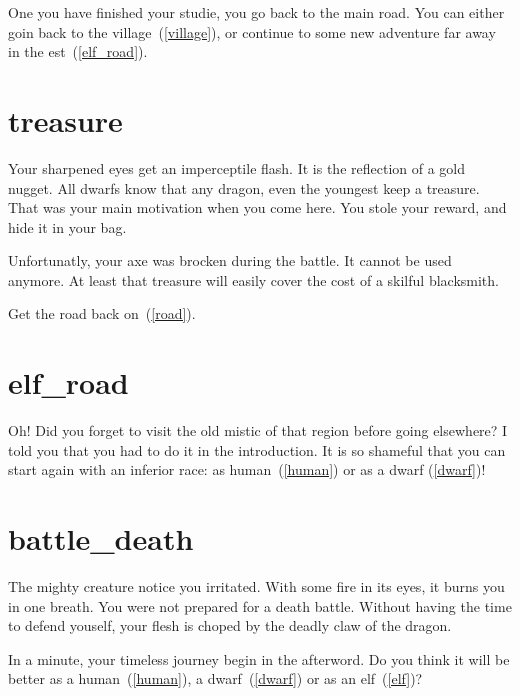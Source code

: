 One you have finished your studie, you go back to the main road. You can either
goin back to the village~(\ref{village}), or continue to some new adventure far
away in the est~(\ref{elf_road}).

\section{treasure}

Your sharpened eyes get an imperceptile flash. It is the reflection of a gold
nugget. All dwarfs know that any dragon, even the youngest keep a treasure. That
was your main motivation when you come here. You stole your reward, and hide it
in your bag.

Unfortunatly, your axe was brocken during the battle. It cannot be used anymore.
At least that treasure will easily cover the cost of a skilful blacksmith.

Get the road back on~(\ref{road}).


\section{elf_road}

Oh! Did you forget to visit the old mistic of that region before going
elsewhere? I told you that you had to do it in the introduction. It is so
shameful that you can start again with an inferior race: as human~(\ref{human})
or as a dwarf (\ref{dwarf})!

\section{battle_death}

The mighty creature notice you irritated. With some fire in its eyes, it burns
you in one breath. You were not prepared for a death battle. Without having the
time to defend youself, your flesh is choped by the deadly claw of the dragon.

\medbreak

In a minute, your timeless journey begin in the afterword. Do you think it will
be better as a human~(\ref{human}), a dwarf~(\ref{dwarf}) or as an elf~(\ref{elf})?
